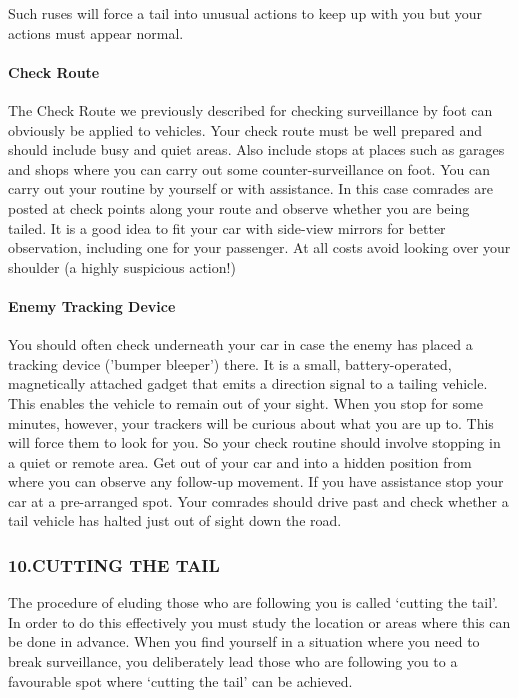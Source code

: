 Such ruses will force a tail into unusual actions to keep up with you
but your actions must appear normal.

\paragraph{Check Route}

The Check Route we previously described for checking surveillance by
foot can obviously be applied to vehicles. Your check route must be well
prepared and should include busy and quiet areas. Also include stops at
places such as garages and shops where you can carry out some
counter-surveillance on foot. You can carry out your routine by yourself
or with assistance. In this case comrades are posted at check points
along your route and observe whether you are being tailed. It is a good
idea to fit your car with side-view mirrors for better observation,
including one for your passenger. At all costs avoid looking over your
shoulder (a highly suspicious action!)

\paragraph{Enemy Tracking Device}

You should often check underneath your car in case the enemy has placed
a tracking device ('bumper bleeper') there. It is a small,
battery-operated, magnetically attached gadget that emits a direction
signal to a tailing vehicle. This enables the vehicle to remain out of
your sight. When you stop for some minutes, however, your trackers will
be curious about what you are up to. This will force them to look for
you. So your check routine should involve stopping in a quiet or remote
area. Get out of your car and into a hidden position from where you can
observe any follow-up movement. If you have assistance stop your car at
a pre-arranged spot. Your comrades should drive past and check whether a
tail vehicle has halted just out of sight down the road.

\subsubsection{10.CUTTING THE TAIL}

The procedure of eluding those who are following you is called `cutting
the tail'. In order to do this effectively you must study the location
or areas where this can be done in advance. When you find yourself in a
situation where you need to break surveillance, you deliberately lead
those who are following you to a favourable spot where `cutting the
tail' can be achieved.

